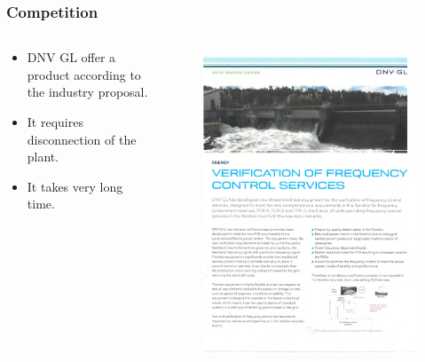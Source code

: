\begin{frame}
		\frametitle{Competition}
		\begin{columns}
				\begin{column}{0.4\textwidth}
						\begin{itemize}
								\item DNV GL offer a product according to the industry proposal.
								\item It requires disconnection of the plant.
								\item It takes very long time.
						\end{itemize}
				\end{column}
				\begin{column}{0.6\textwidth}
						\begin{figure}
								\includegraphics[width=\textwidth]{./pictures/DNV}
						\end{figure}
				\end{column}
		\end{columns}
\end{frame}
